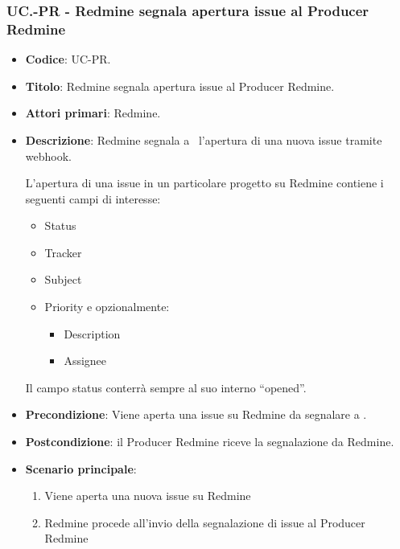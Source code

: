 	\subsubsection{UC\theuccount.\thesubuccount-PR - Redmine segnala apertura issue al Producer Redmine}
	\begin{itemize}
		\item \textbf{Codice}: UC\theuccount-PR.
		\item \textbf{Titolo}: Redmine segnala apertura issue al Producer Redmine.
		\item \textbf{Attori primari}: Redmine.
		\item \textbf{Descrizione}: Redmine segnala a \progetto\ l'apertura di una nuova issue tramite webhook.
		
		L'apertura di una issue in un particolare progetto su Redmine contiene i seguenti campi di interesse:
		\begin{itemize}
			\item Status
			\item Tracker
			\item Subject
			\item Priority e opzionalmente:
			\begin{itemize}
				\item Description
				\item Assignee
			\end{itemize}
		\end{itemize}
		Il campo status conterrà sempre al suo interno ``opened''.
		\item \textbf{Precondizione}: Viene aperta una issue su Redmine da
		segnalare a \progetto.
		\item \textbf{Postcondizione}: il Producer Redmine riceve la segnalazione da Redmine.
		\item \textbf{Scenario principale}: 
		\begin{enumerate}
			\item Viene aperta una nuova issue su Redmine
			\item Redmine procede all'invio della segnalazione di issue al Producer Redmine
		\end{enumerate}
		
	\end{itemize}